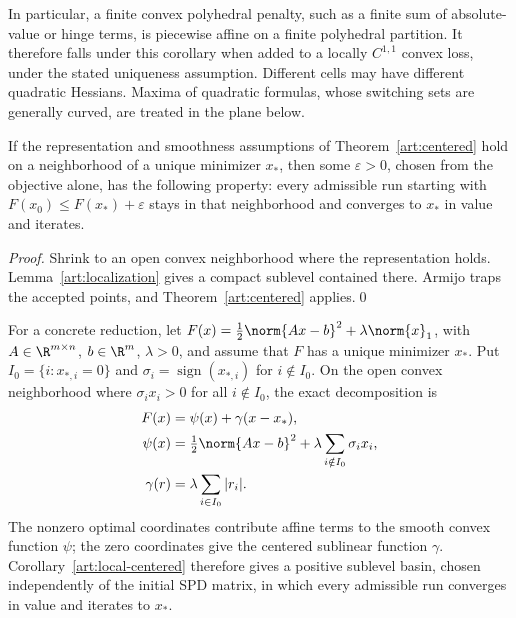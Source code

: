 In particular, a finite convex polyhedral penalty, such as a finite sum of
absolute-value or hinge terms, is piecewise affine on a finite polyhedral
partition. It therefore falls under this corollary when added to a locally
$C^{1,1}$ convex loss,
under the stated uniqueness assumption. Different cells may have different
quadratic Hessians. Maxima of quadratic formulas, whose switching sets are
generally curved, are treated in the plane below.

\begin{corollary}\label{art:local-centered}
If the representation and smoothness assumptions of
Theorem~\ref{art:centered} hold on a neighborhood of a unique minimizer $x_*$,
then some $\varepsilon>0$, chosen from the objective alone, has the following
property: every admissible run starting with
$F(x_0)\le F(x_*)+\varepsilon$ stays in that neighborhood and converges to
$x_*$ in value and iterates.
\end{corollary}
\begin{proof}
Shrink to an open convex neighborhood where the representation holds.
Lemma~\ref{art:localization} gives a compact sublevel contained there.
Armijo traps the accepted points, and Theorem~\ref{art:centered} applies.\qed
\end{proof}

For a concrete reduction, let
$F(x)=\tfrac12\norm{Ax-b}^2+\lambda\norm{x}_1$, with
$A\in\R^{m\times n}$, $b\in\R^m$, $\lambda>0$, and assume that $F$ has a
unique minimizer $x_*$. Put $I_0=\{i:x_{*,i}=0\}$ and
$\sigma_i=\operatorname{sign}(x_{*,i})$ for $i\notin I_0$.
On the open convex neighborhood where $\sigma_i x_i>0$ for all
$i\notin I_0$, the exact decomposition is
\begin{equation}\label{art:local-l1-decomposition}
 \begin{aligned}
 F(x)&=\psi(x)+\gamma(x-x_*),\\
 \psi(x)&=\tfrac12\norm{Ax-b}^2+
                \lambda\sum_{i\notin I_0}\sigma_i x_i,\\
 \gamma(r)&=\lambda\sum_{i\in I_0}|r_i|.
 \end{aligned}
\end{equation}
The nonzero optimal coordinates contribute affine terms to the smooth
convex function $\psi$; the zero coordinates give the centered sublinear
function $\gamma$. Corollary~\ref{art:local-centered} therefore gives a
positive sublevel basin, chosen independently of the initial SPD matrix,
in which every admissible run converges in value and iterates to $x_*$.

